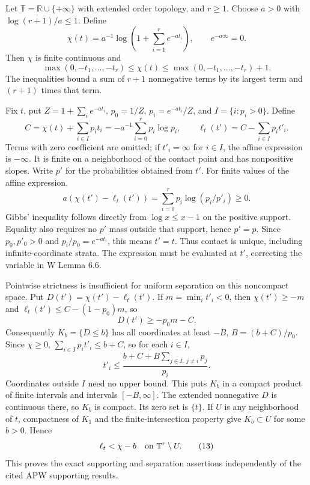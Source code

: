\documentclass[
  11pt,
]{article}
\begin{document}
Let \(\mathbb T=\mathbb R\cup\{+\infty\}\) with extended order topology,
and \(r\geq1\). Choose \(a>0\) with \(\log(r+1)/a\leq1\). Define
\[\chi(t)=a^{-1}\log\left(1+\sum_{i=1}^r e^{-a t_i}\right),
\qquad e^{-a\infty}=0.\] Then \(\chi\) is finite continuous and
\[\max(0,-t_1,\ldots,-t_r)\leq\chi(t)
\leq\max(0,-t_1,\ldots,-t_r)+1.\tag{12}\] The inequalities bound a sum
of \(r+1\) nonnegative terms by its largest term and \((r+1)\) times
that term.

Fix \(t\), put \(Z=1+\sum_i e^{-at_i}\), \(p_0=1/Z\),
\(p_i=e^{-at_i}/Z\), and \(I=\{i:p_i>0\}\). Define
\[C=\chi(t)+\sum_{i\in I}p_i t_i
 =-a^{-1}\sum_{i=0}^r p_i\log p_i,\qquad
 \ell_t(t')=C-\sum_{i\in I}p_i t'_i.\] Terms with zero coefficient are
omitted; if \(t'_i=\infty\) for \(i\in I\), the affine expression is
\(-\infty\). It is finite on a neighborhood of the contact point and has
nonpositive slopes. Write \(p'\) for the probabilities obtained from
\(t'\). For finite values of the affine expression,
\[a(\chi(t')-\ell_t(t'))=\sum_{i=0}^r p_i\log(p_i/p'_i)\geq0.\] Gibbs'
inequality follows directly from \(\log x\leq x-1\) on the positive
support. Equality also requires no \(p'\) mass outside that support,
hence \(p'=p\). Since \(p_0,p'_0>0\) and \(p_i/p_0=e^{-at_i}\), this
means \(t'=t\). Thus contact is unique, including infinite-coordinate
strata. The expression must be evaluated at \(t'\), correcting the
variable in W Lemma 6.6.

Pointwise strictness is insufficient for uniform separation on this
noncompact space. Put \(D(t')=\chi(t')-\ell_t(t')\). If
\(m=\min_i t'_i<0\), then \(\chi(t')\geq-m\) and
\(\ell_t(t')\leq C-(1-p_0)m\), so \[D(t')\geq-p_0m-C.\] Consequently
\(K_b=\{D\leq b\}\) has all coordinates at least \(-B\),
\(B=(b+C)/p_0\). Since \(\chi\geq0\), \(\sum_{i\in I}p_i t'_i\leq b+C\),
so for each \(i\in I\),
\[t'_i\leq\frac{b+C+B\sum_{j\in I,\ j\ne i}p_j}{p_i}.\] Coordinates
outside \(I\) need no upper bound. This puts \(K_b\) in a compact
product of finite intervals and intervals \([-B,\infty]\). The extended
nonnegative \(D\) is continuous there, so \(K_b\) is compact. Its zero
set is \(\{t\}\). If \(U\) is any neighborhood of \(t\), compactness of
\(K_1\) and the finite-intersection property give \(K_b\subset U\) for
some \(b>0\). Hence
\[\ell_t<\chi-b\quad\hbox{on }\mathbb T^r\setminus U.\tag{13}\] This
proves the exact supporting and separation assertions independently of
the cited APW supporting results.
\end{document}
